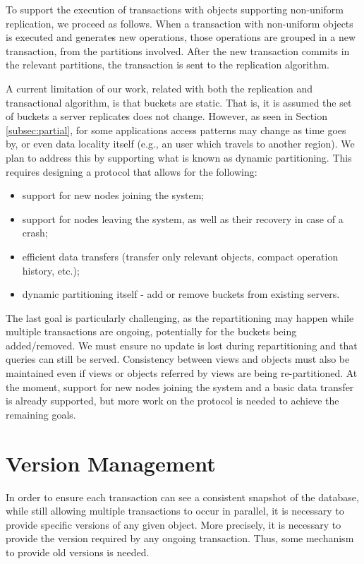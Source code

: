 
To support the execution of transactions with objects supporting non-uniform replication, we proceed as follows.
When a transaction with non-uniform objects is executed and generates new operations, those operations are grouped in a new transaction, from the partitions involved.
After the new transaction commits in the relevant partitions, the transaction is sent to the replication algorithm.

A current limitation of our work, related with both the replication and transactional algorithm, is that buckets are static.
That is, it is assumed the set of buckets a server replicates does not change.
However, as seen in Section \ref{subsec:partial}, for some applications access patterns may change as time goes by, or even data locality itself (e.g., an user which travels to another region).
We plan to address this by supporting what is known as dynamic partitioning.
This requires designing a protocol that allows for the following:

\begin{itemize}
	\item support for new nodes joining the system;
	\item support for nodes leaving the system, as well as their recovery in case of a crash;
	\item efficient data transfers (transfer only relevant objects, compact operation history, etc.);
	\item dynamic partitioning itself - add or remove buckets from existing servers.
\end{itemize}	

The last goal is particularly challenging, as the repartitioning may happen while multiple transactions are ongoing, potentially for the buckets being added/removed.
We must ensure no update is lost during repartitioning and that queries can still be served.
Consistency between views and objects must also be maintained even if views or objects referred by views are being re-partitioned.
At the moment, support for new nodes joining the system and a basic data transfer is already supported, but more work on the protocol is needed to achieve the remaining goals.

\section{Version Management}
\label{sec:version_management}

In order to ensure each transaction can see a consistent snapshot of the database, while still allowing multiple transactions to occur in parallel, it is necessary to provide specific versions of any given object.
More precisely, it is necessary to provide the version required by any ongoing transaction.
Thus, some mechanism to provide old versions is needed.

